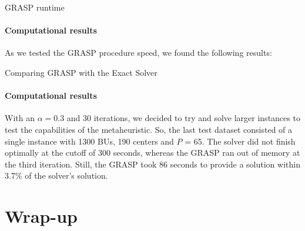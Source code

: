 \documentclass{beamer}
\begin{document}
\begin{frame}{GRASP runtime}
    \framesubtitle{Computational results}
    As we tested the GRASP procedure speed, we found the following results:

    \begin{table}
        \centering
        \caption{Summary of the experiment results}
        \label{tab:grasp_optim_comp}
    \end{table}
   
\end{frame}

\begin{frame}{Comparing GRASP with the Exact Solver}
    \framesubtitle{Computational results}
    With an $\alpha = 0.3$ and 30 iterations, we decided to try and solve larger instances to test the capabilities of the metaheuristic. So, the last test dataset consisted of a single instance with 1300 BUs, 190 centers and $P$ = 65. The solver did not finish optimally at the cutoff of 300 seconds, whereas the GRASP ran out of memory at the third iteration. Still, the GRASP took 86 seconds to provide a solution within 3.7\% of the solver's solution.
\end{frame}



\section{Wrap-up}
\end{document}
